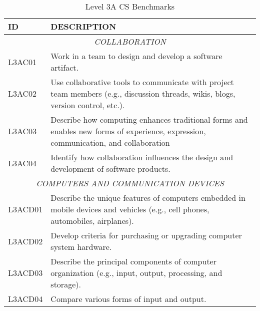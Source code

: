 \begin{longtable}{p{1.8cm}p{11cm}}
\caption{Level 3A CS Benchmarks} \\
\textbf{ID} & \textbf{DESCRIPTION} \\ \hline
\multicolumn{2}{c}{\textit{COLLABORATION}} \\
 L3AC01  & Work in a team to design and develop a software artifact.                                                                                                                                                                  \\
 L3AC02  & Use collaborative tools to communicate with project team members (e.g., discussion threads, wikis, blogs, version control, etc.).                                                                                          \\
 L3AC03  & Describe how computing enhances traditional forms and enables new forms of experience, expression, communication, and collaboration                                                                                        \\
 L3AC04  & Identify how collaboration influences the design and development of software products.                                                                                                                                     \\
 \multicolumn{2}{c}{\textit{COMPUTERS AND COMMUNICATION DEVICES}}                                                                                                                                                                                   \\
 L3ACD01 & Describe the unique features of computers embedded in mobile devices and vehicles (e.g., cell phones, automobiles, airplanes).                                                                                             \\
 L3ACD02 & Develop criteria for purchasing or upgrading computer system hardware.                                                                                                                                                     \\
 L3ACD03 & Describe the principal components of computer organization (e.g., input, output, processing, and storage).                                                                                                                 \\
 L3ACD04 & Compare various forms of input and output.                                                                                                                                                                                 \\

\end{longtable}
